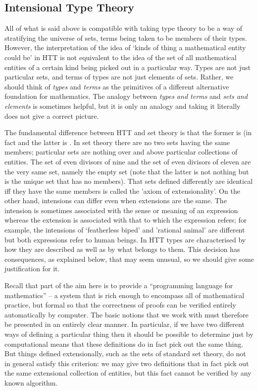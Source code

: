 \subsection{Intensional Type Theory}
\label{sec:TypeTheory-Intensional}

All of what is said above is compatible with taking type theory to be a way of stratifying the universe of sets, terms being taken to be members of their types. However, the interpretation of the idea of `kinds of thing a mathematical entity could be' in HTT is not equivalent to the idea of the set of all mathematical entities of a certain kind being picked out in a particular way. 
Types are not just particular sets, and terms of types are not just elements of 
sets. Rather, we should think of \emph{types} and \emph{terms} as the primitives of a different alternative foundation for mathematics. The analogy between \emph{types and terms} and \emph{sets and elements} is sometimes helpful, but it is only an analogy and taking it literally does not give a correct picture.

The fundamental difference between HTT and set theory is that the former is  (in fact  and the latter is . In set theory there are no two sets having the same members; particular sets are nothing over and above particular collections of entities. The set of even divisors of nine and the set of even divisors of eleven are the very same set, namely the empty set (note that the latter is not nothing but is the unique set that has no members). That sets defined differently are identical iff they have the same members is called the 'axiom of extensionality'. On the other hand, intensions can differ even when extensions are the same. The intension is sometimes associated with the sense or meaning of an expression whereas the extension is associated with that to which the expression refers; for example, the intensions of `featherless biped' and 'rational animal' are different but both expressions refer to human beings. In HTT types are characterised by how they are described as well as by what belongs to them. This decision has consequences, as explained below, that may seem unusual, so we should give some justification for it.

Recall that part of the aim here 
is to provide a ``programming language for mathematics'' -- a system that is rich enough to encompass all of mathematical practice, but formal so that the correctness of proofs can be verified entirely automatically by computer. The basic notions that we work with must therefore be presented in an entirely clear manner. In particular, if we have two different ways of defining a particular thing then it should be possible to determine just by computational means that these definitions do in fact pick out the same thing. But things defined extensionally, such as the sets of standard set theory, do not in general satisfy this criterion: we may give two definitions that in fact pick out the same extensional collection of entities, but this fact cannot be verified by any known algorithm.

